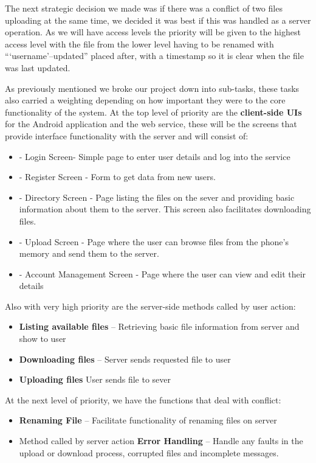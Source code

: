 \documentclass[11pt]{informatics-report}
\begin{document}
The next strategic decision we made was if there was a conflict of two files uploading at the same time, we decided it was best if this was handled as a server operation. As we will have access levels the priority will be given to the highest access level with the file from the lower level having to be renamed with “‘username’–updated” placed after, with a timestamp so it is clear when the file was last updated. 

As previously mentioned we broke our project down into sub-tasks, these tasks also carried a weighting depending on how important they were to the core functionality of the system. At the top level of priority are the \textbf{client-side UIs}  for the Android application and the web service, these will be the screens that provide interface functionality with the server and will consist of:

\begin{itemize}
\item -	Login Screen- Simple page to enter user details and log into the service
\item -	Register Screen - Form to get data from new users.
\item -	Directory Screen - Page listing the files on the sever and providing basic information about them to the server. This screen also facilitates downloading files.
\item -	Upload Screen - Page where the user can browse files from the phone’s memory and send them to the server.
\item -	Account Management Screen - Page where the user can view and edit their details
\end{itemize}

Also with very high priority are the server-side methods called by user action: 

\begin{itemize}
\item \textbf{Listing available files} – Retrieving basic file information from server and show to user 
\item \textbf{Downloading files} – Server sends requested file to user
\item \textbf{Uploading files } User sends file to sever
\end{itemize}

At the next level of priority, we have the functions that deal with conflict: 

\begin{itemize}
\item \textbf{Renaming File } – Facilitate functionality of renaming files on server
\item Method called by server action  \textbf{Error Handling } – Handle any faults in the upload or download process, corrupted files and incomplete messages.
\end{itemize}
\end{document}
